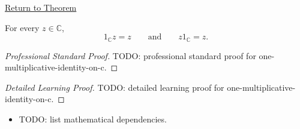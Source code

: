 \newpage
{}
\label{prf:one-multiplicative-identity-on-c}

\begin{remark*}[Return]
\hyperref[thm:one-multiplicative-identity-on-c]{Return to Theorem}
\end{remark*}

\begin{theorem*}
For every \(z\in\mathbb{C}\),
\[
1_{\mathbb{C}}z=z
\qquad\text{and}\qquad
z1_{\mathbb{C}}=z.
\]
\end{theorem*}

\begin{proof}[Professional Standard Proof]
\LRAProofBodyStart
TODO: professional standard proof for one-multiplicative-identity-on-c.
\end{proof}

\begin{proof}[Detailed Learning Proof]
\LRAProofBodyStart
TODO: detailed learning proof for one-multiplicative-identity-on-c.
\end{proof}

\begin{remark*}
\end{remark*}

\begin{dependencies}
\begin{itemize}
  \item TODO: list mathematical dependencies.
\end{itemize}
\end{dependencies}

\clearpage
